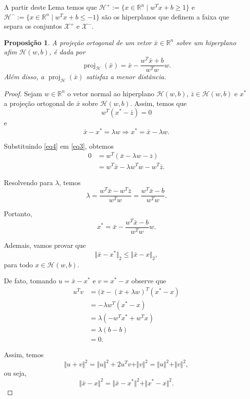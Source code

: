 \documentclass[12pt,a4paper]{scrartcl}
\DeclareMathOperator{\proj}{proj}
\def\Xset{\mathcal{X}}
\def\Hset{\mathcal{H}}
\def\RR{\mathds{R}}
\def\xbar{\bar{x}}
\newtheorem{prop}{Proposição}
\theoremstyle{definition}%
\begin{document}
A partir deste Lema temos que $\Hset^{+}:=\{x\in \RR^n \mid w^{T}x+b\geq 1\}$ e $\Hset^{-}:=\{x\in \RR^n \mid w^{T}x+b\leq -1\}$ são os hiperplanos que definem a faixa que separa os conjuntos $\Xset^{+}$ e $\Xset^{-}$.

\begin{prop} \label{prop1} A projeção ortogonal de um vetor $\xbar\in \RR^n$ sobre um hiperplano afim $\Hset(w,b)$, é dada por
\[ \proj_{\Hset}(\xbar)= \xbar - \dfrac{w^{T}\xbar+b}{w^{T}w}w. \]
Além disso, a $\proj_{\Hset}(\xbar)$ satisfaz a menor distância.
\end{prop}

\begin{proof}
Sejam $w\in \RR^n$ o vetor normal ao hiperplano $\Hset(w,b)$, $\bar{z}\in \Hset(w,b)$ e $x^{*}$ a projeção ortogonal de $\xbar$ sobre $\Hset(w,b)$. Assim, temos que 
\[ \label{eq3} w^{T}(x^{*}-\bar{z})=0 \]
e
\[ \label{eq4} \xbar-x^{*}=\lambda w \Longrightarrow x^{*}=\xbar-\lambda w. \]

Substituindo \eqref{eq4} em \eqref{eq3}, obtemos
\begin{align}
0 &= w^{T}(\xbar-\lambda w-\overline{z}) \\
&= w^{T}\xbar-\lambda w^{T}w - w^{T}\bar{z}.
\end{align}

Resolvendo para $\lambda$, temos
\[ \lambda =\dfrac{w^{T}\xbar-w^{T}\bar{z}}{w^{T}w} =\dfrac{w^{T}\xbar-b}{w^{T}w}. \]

Portanto, 
\[ x^{*}=\xbar-\dfrac{w^{T}\xbar-b}{w^{T}w}w . \]

Ademais, vamos provar que
\[ \Vert\xbar-x^{*}\Vert_{2} \leq \Vert \xbar-x\Vert_{2}, \]
para todo $x\in \Hset(w,b)$.

De fato, tomando $u=\xbar-x^{*}$ e $v=x^{*}-x$ observe que 
\begin{align}
u^{T}v&=(\xbar-(\xbar+\lambda w)^{T}(x^{*}-x) \\
&= -\lambda w^{T}(x^{*}-x) \\
&= \lambda (-w^{T}x^{*}+w^{T}x) \\
&= \lambda (b-b) \\
&= 0.
\end{align}

Assim, temos
\[ \Vert u+v\Vert^{2}=\Vert u\Vert^{2} + 2u^{T}v + \Vert v\Vert^{2}=\Vert u\Vert^{2} + \Vert v\Vert^{2} , \]
ou seja,
\[ \Vert \xbar-x\Vert^{2}=\Vert \xbar-x^{*}\Vert^{2} + \Vert x^{*}-x\Vert^{2}. \]

\end{proof}
\end{document}
